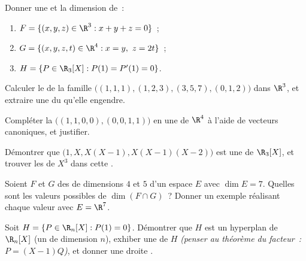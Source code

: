 \begin{exercise}[$\star$]\label{exo:b1:findim:1}
Donner une  et la dimension de~:
\begin{enumerate}
  \item $F = \{(x,y,z) \in \R^3 : x + y + z = 0\}$~;
  \item $G = \{(x,y,z,t) \in \R^4 : x = y,\ z = 2t\}$~;
  \item $H = \{P \in \R_3[X] : P(1) = P'(1) = 0\}$.
\end{enumerate}
\end{exercise}

\begin{exercise}[$\star$]\label{exo:b1:findim:2}
Calculer le  de la famille
$\bigl((1,1,1), (1,2,3), (3,5,7), (0,1,2)\bigr)$ dans $\R^3$, et
extraire une  du  qu'elle engendre.
\end{exercise}

\begin{exercise}[$\star$]\label{exo:b1:findim:3}
Compléter la  $\bigl((1,1,0,0), (0,0,1,1)\bigr)$ en une
 de $\R^4$ à l'aide de vecteurs canoniques, et justifier.
\end{exercise}

\begin{exercise}[$\star$]\label{exo:b1:findim:4}
Démontrer que $\bigl(1, X, X(X-1), X(X-1)(X-2)\bigr)$ est une  de
$\R_3[X]$, et trouver les  de $X^3$ dans cette .
\end{exercise}

\begin{exercise}[$\star\star$]\label{exo:b1:findim:5}
Soient $F$ et $G$ des  de dimensions $4$ et $5$
d'un espace $E$ avec $\dim E = 7$. Quelles sont les valeurs possibles
de $\dim(F \cap G)$~? Donner un exemple réalisant chaque valeur avec
$E = \R^7$.
\end{exercise}

\begin{exercise}[$\star\star$]\label{exo:b1:findim:6}
Soit $H = \{P \in \R_n[X] : P(1) = 0\}$. Démontrer que $H$ est un
hyperplan de $\R_n[X]$ (un  de dimension $n$), exhiber une
 de $H$ \emph{(penser au théorème du facteur~: $P = (X-1)Q$)}, et
donner une droite .
\end{exercise}

